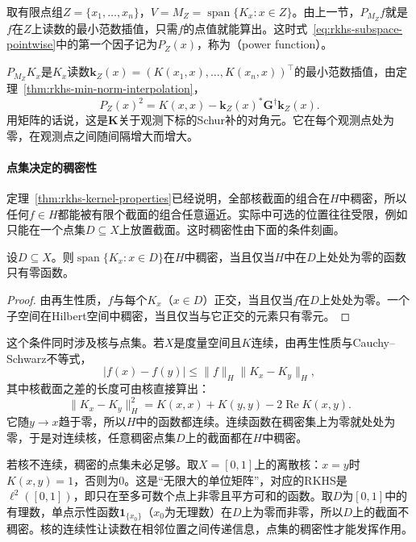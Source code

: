 取有限点组$Z=\{x_1,\ldots,x_n\}$，$V=M_Z=\operatorname{span}\{K_x:x\in Z\}$。由上一节，$P_{M_Z}f$就是$f$在$Z$上读数的最小范数插值，只需$f$的点值就能算出。这时式~\eqref{eq:rkhs-subspace-pointwise}中的第一个因子记为$P_Z(x)$，称为（power function）。

$P_{M_Z}K_x$是$K_x$读数$\bm k_Z(x)=(K(x_1,x),\ldots,K(x_n,x))^{\top}$的最小范数插值，由定理~\ref{thm:rkhs-min-norm-interpolation}，
\begin{equation}
P_Z(x)^2=K(x,x)-\bm k_Z(x)^*\bm G^{\dagger}\bm k_Z(x).
\label{eq:rkhs-power-function}
\end{equation}
用矩阵的话说，这是$\bm K$关于观测下标的Schur补的对角元。它在每个观测点处为零，在观测点之间随间隔增大而增大。

\paragraph{点集决定的稠密性}

定理~\ref{thm:rkhs-kernel-properties}已经说明，全部核截面的组合在$H$中稠密，所以任何$f\in H$都能被有限个截面的组合任意逼近。实际中可选的位置往往受限，例如只能在一个点集$D\subseteq X$上放置截面。这时稠密性由下面的条件刻画。

\begin{theorem}[限定点集的核截面稠密性]
\label{thm:rkhs-dense-sections}
设$D\subseteq X$。则$\operatorname{span}\{K_x:x\in D\}$在$H$中稠密，当且仅当$H$中在$D$上处处为零的函数只有零函数。
\end{theorem}

\begin{proof}
由再生性质，$f$与每个$K_x$（$x\in D$）正交，当且仅当$f$在$D$上处处为零。一个子空间在Hilbert空间中稠密，当且仅当与它正交的元素只有零元。
\end{proof}

这个条件同时涉及核与点集。若$X$是度量空间且$K$连续，由再生性质与Cauchy--Schwarz不等式，
\[
\lvert f(x)-f(y)\rvert\leq\lVert f\rVert_H\lVert K_x-K_y\rVert_H ,
\]
其中核截面之差的长度可由核直接算出：
\[
\lVert K_x-K_y\rVert_H^2=K(x,x)+K(y,y)-2\operatorname{Re}K(x,y) .
\]
它随$y\to x$趋于零，所以$H$中的函数都连续。连续函数在稠密集上为零就处处为零，于是对连续核，任意稠密点集$D$上的截面都在$H$中稠密。

若核不连续，稠密的点集未必足够。取$X=[0,1]$上的离散核：$x=y$时$K(x,y)=1$，否则为$0$。这是“无限大的单位矩阵”，对应的RKHS是$\ell^2([0,1])$，即只在至多可数个点上非零且平方可和的函数。取$D$为$[0,1]$中的有理数，单点示性函数$\mathbf 1_{\{x_0\}}$（$x_0$为无理数）在$D$上为零而非零，所以$D$上的截面不稠密。核的连续性让读数在相邻位置之间传递信息，点集的稠密性才能发挥作用。

